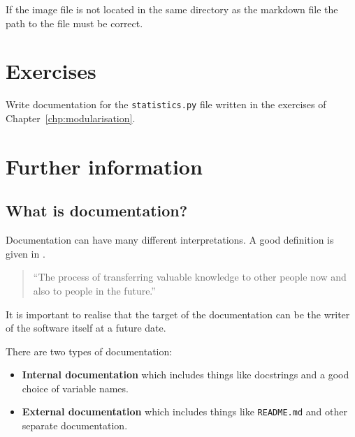 \begin{note}

If the image file is not located in the same directory as the markdown file the
path to the file must be correct.
\end{note}




\section{Exercises}

Write documentation for the \texttt{statistics.py} file written in the exercises of
Chapter~\ref{chp:modularisation}.


\section{Further information}
\label{\detokenize{building-tools/06-documentation/why/main:further-information}}\label{\detokenize{building-tools/06-documentation/why/main:documentation-further-information}}\label{\detokenize{building-tools/06-documentation/why/main::doc}}

\subsection{What is documentation?}
\label{\detokenize{building-tools/06-documentation/why/main:what-is-documentation}}

Documentation can have many different interpretations. A good definition is
given in \cite{martraire2019living}.

\begin{quote}
``The process of transferring valuable knowledge to other people now and also to
people in the future.''
\end{quote}

\begin{note}
It is important to realise that the target of the documentation can be the
writer of the software itself at a future date.
\end{note}


There are two types of documentation:
\begin{itemize}
\item 

\textbf{Internal documentation} which includes things like docstrings and a good
choice of variable names.

\item 

\textbf{External documentation} which includes things like \texttt{README.md} and other
separate documentation.

\end{itemize}


